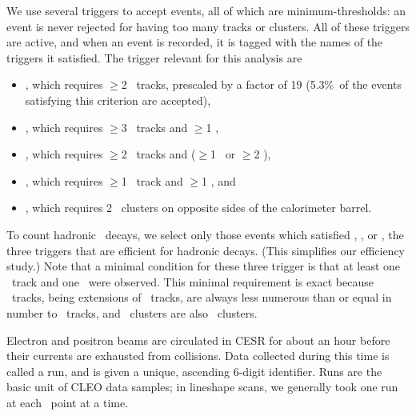 \documentclass{cornell}
\begin{document}
We use several triggers to accept events, all of which are
minimum-thresholds: an event is never rejected for having too many
tracks or clusters.  All of these triggers are active, and when an
event is recorded, it is tagged with the names of the triggers it
satisfied.  The trigger relevant for this analysis are
\begin{itemize}

  \item \twotrack, which requires $\ge$2 \axial\ tracks, prescaled by
  a factor of 19 (5.3\%~of the events satisfying this criterion are
  accepted),

  \item \hadron, which requires $\ge$3 \axial\ tracks and $\ge$1 \cblo, \label{pag:triggerdefs}

  \item \radtau, which requires $\ge$2 \stereo\ tracks and ($\ge$1 \cbmd\ or $\ge$2 \cblo),

  \item \eltrack, which requires $\ge$1 \axial\ track and $\ge$1 \cblo, and

  \item \barrelbhabha, which requires 2 \cbhi\ clusters on opposite
  sides of the calorimeter barrel.

\end{itemize}
To count hadronic \ups\ decays, we select only those events which
satisfied \hadron, \radtau, or \eltrack, the three triggers that are
efficient for hadronic decays.  (This simplifies our efficiency study.)
Note that a minimal condition for these three trigger is
that at least one \axial\ track and one \cblo\ were observed.  This
minimal requirement is exact because \stereo\ tracks, being extensions
of \axial\ tracks, are always less numerous than or equal in number
to \axial\ tracks, and \cbmd\ clusters are also \cblo\ clusters.

Electron and positron beams are circulated in CESR for about an hour
before their currents are exhausted from collisions.  Data collected
during this time is called a run, and is given a unique, ascending
6-digit identifier.  Runs are the basic unit of CLEO data samples; in
lineshape scans, we generally took one run at each \ecm\ point at a
time.
\end{document}
